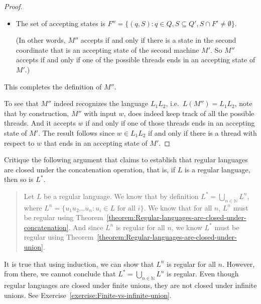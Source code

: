 \begin{flex}
\begin{proof}
\begin{itemize}
    \item The set of accepting states is $F'' = \{(q, S) : q \in Q, S \subseteq Q', S \cap F' \neq \emptyset \}$.

    (In other words, $M''$ accepts if and only if there is a state in the second coordinate that is an accepting state of the second machine $M'$. So $M''$ accepts if and only if one of the possible threads ends in an accepting state of $M'$.)

\end{itemize}

This completes the definition of $M''$. 

To see that $M''$ indeed recognizes the language $L_1 L_2$, i.e.~$L(M'') = L_1 L_2$, note that by construction, $M''$ with input $w$, does indeed keep track of all the possible threads. 
And it accepts $w$ if and only if one of those threads ends in an accepting state of $M'$. 
The result follows since $w \in L_1 L_2$ if and only if there is a thread with respect to $w$ that ends in an accepting state of $M'$.

\end{proof}
\end{flex}

\begin{flex}
\label{grp:exercise:Regular-languages-are-closed-under-star}

\begin{exercise}
\label{exercise:Regular-languages-are-closed-under-star}
Critique the following argument that claims to establish that regular languages are closed under the concatenation operation, that is, if $L$ is a regular language, then so is $L^*$.
\begin{quote}
Let $L$ be a regular language. We know that by definition $L^* = \bigcup_{n \in \mathbb{N}} L^n$, where $L^n = \{u_1 u_2 \ldots u_n : u_i \in L \text{ for all $i$} \}$. We know that for all $n$, $L^n$ must be regular using Theorem~\ref{theorem:Regular-languages-are-closed-under-concatenation}. And since $L^n$ is regular for all $n$, we know $L^*$ must be regular using Theorem~\ref{theorem:Regular-languages-are-closed-under-union}.
\end{quote}

\end{exercise}

\begin{solution}
\label{sol:deterministic-finite-automata::true}
It is true that using induction, we can show that $L^n$ is regular for all $n$. However, from there, we cannot conclude that $L^* = \bigcup_{n \in \mathbb{N}} L^n$ is regular. Even though regular languages are closed under finite unions, they are not closed under infinite unions. See Exercise~\ref{exercise:Finite-vs-infinite-union}.

\end{solution}
\end{flex}

